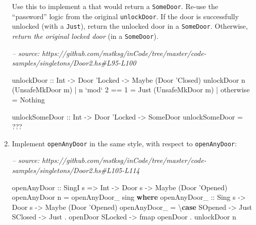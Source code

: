 \documentclass[]{article}
\newenvironment{Shaded}{}{}
\newcommand{\CharTok}[1]{\textcolor[rgb]{0.25,0.44,0.63}{#1}}
\newcommand{\CommentTok}[1]{\textcolor[rgb]{0.38,0.63,0.69}{\textit{#1}}}
\newcommand{\DataTypeTok}[1]{\textcolor[rgb]{0.56,0.13,0.00}{#1}}
\newcommand{\DecValTok}[1]{\textcolor[rgb]{0.25,0.63,0.44}{#1}}
\newcommand{\FunctionTok}[1]{\textcolor[rgb]{0.02,0.16,0.49}{#1}}
\newcommand{\KeywordTok}[1]{\textcolor[rgb]{0.00,0.44,0.13}{\textbf{#1}}}
\newcommand{\NormalTok}[1]{#1}
\newcommand{\OtherTok}[1]{\textcolor[rgb]{0.00,0.44,0.13}{#1}}
\begin{document}
\begin{enumerate}
  Use this to implement a that would return a \texttt{SomeDoor}. Re-use the
  ``password'' logic from the original \texttt{unlockDoor}. If the door is
  successfully unlocked (with a \texttt{Just}), return the unlocked door in a
  \texttt{SomeDoor}. Otherwise, \emph{return the original locked door} (in a
  \texttt{SomeDoor}).

\begin{Shaded}
\begin{Highlighting}[]
\CommentTok{-- source: https://github.com/mstksg/inCode/tree/master/code-samples/singletons/Door2.hs#L95-L100}

\OtherTok{unlockDoor ::} \DataTypeTok{Int} \OtherTok{->} \DataTypeTok{Door} \CharTok{'Locked -> Maybe (Door '}\DataTypeTok{Closed}\NormalTok{)}
\NormalTok{unlockDoor n (}\DataTypeTok{UnsafeMkDoor}\NormalTok{ m)}
    \FunctionTok{|}\NormalTok{ n }\OtherTok{`mod`} \DecValTok{2} \FunctionTok{==} \DecValTok{1} \FunctionTok{=} \DataTypeTok{Just}\NormalTok{ (}\DataTypeTok{UnsafeMkDoor}\NormalTok{ m)}
    \FunctionTok{|}\NormalTok{ otherwise      }\FunctionTok{=} \DataTypeTok{Nothing}

\OtherTok{unlockSomeDoor ::} \DataTypeTok{Int} \OtherTok{->} \DataTypeTok{Door} \CharTok{'Locked -> SomeDoor}
\NormalTok{unlockSomeDoor }\FunctionTok{=} \FunctionTok{???}
\end{Highlighting}
\end{Shaded}
\item
  Implement \texttt{openAnyDoor\textquotesingle{}} in the same style, with
  respect to \texttt{openAnyDoor}:

\begin{Shaded}
\begin{Highlighting}[]
\CommentTok{-- source: https://github.com/mstksg/inCode/tree/master/code-samples/singletons/Door2.hs#L105-L114}

\OtherTok{openAnyDoor ::} \DataTypeTok{SingI}\NormalTok{ s }\OtherTok{=>} \DataTypeTok{Int} \OtherTok{->} \DataTypeTok{Door}\NormalTok{ s }\OtherTok{->} \DataTypeTok{Maybe}\NormalTok{ (}\DataTypeTok{Door} \CharTok{'Opened)}
\NormalTok{openAnyDoor n }\FunctionTok{=}\NormalTok{ openAnyDoor_ sing}
  \KeywordTok{where}
\OtherTok{    openAnyDoor_ ::} \DataTypeTok{Sing}\NormalTok{ s }\OtherTok{->} \DataTypeTok{Door}\NormalTok{ s }\OtherTok{->} \DataTypeTok{Maybe}\NormalTok{ (}\DataTypeTok{Door} \CharTok{'Opened)}
\NormalTok{    openAnyDoor_ }\FunctionTok{=}\NormalTok{ \textbackslash{}}\KeywordTok{case}
      \DataTypeTok{SOpened} \OtherTok{->} \DataTypeTok{Just}
      \DataTypeTok{SClosed} \OtherTok{->} \DataTypeTok{Just} \FunctionTok{.}\NormalTok{ openDoor}
      \DataTypeTok{SLocked} \OtherTok{->}\NormalTok{ fmap openDoor }\FunctionTok{.}\NormalTok{ unlockDoor n}


\end{Highlighting}
\end{Shaded}
\end{enumerate}
\end{document}
